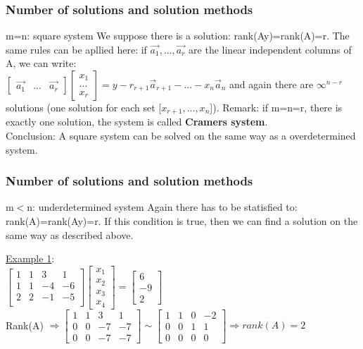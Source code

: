 \begin{frame}
	\frametitle{Number of solutions and solution methods}
	\begin{block}{m=n: square system}
		We suppose there is a solution: rank(Ay)=rank(A)=r. The same rules can be apllied here: if $\overrightarrow{a_1},...,\overrightarrow{a_r}$ are the linear independent columns of A, we can write:\\
		$\begin{bmatrix}
		\overrightarrow{a_1} & ... & \overrightarrow{a_r}
		\end{bmatrix} \begin{bmatrix}
		x_1\\...\\x_r
		\end{bmatrix}=y-r_{r+1}\overrightarrow{a}_{r+1}-...-x_n\overrightarrow{a}_n$ and again there are $\infty^{n-r}$ solutions (one solution for each set [$x_{r+1},...,x_{n}$]).\vspace{4mm}
		Remark: if m=n=r, there is exactly one solution, the system is called \textbf{Cramers system}.\\
		Conclusion: A square system can be solved on the same way as a overdetermined system. 
	\end{block}
\end{frame}

\begin{frame}
	\frametitle{Number of solutions and solution methods}
	\begin{block}{m$<$n: underdetermined system}
		Again there has to be statisfied to: rank(A)=rank(Ay)=r. If this condition is true, then we can find a solution on the same way as described above.\vspace{4mm} 
		
		\underline{Example 1}:\\
		$\begin{bmatrix}
		1 & 1 & 3 & 1\\
		1 & 1 & -4 & -6\\
		2 & 2 & -1 & -5\\
		\end{bmatrix}\begin{bmatrix}
		x_1\\x_2\\x_3\\x_4\end{bmatrix}=\begin{bmatrix}
		6\\-9\\2
		\end{bmatrix}$\\
		Rank(A) $\Rightarrow \begin{bmatrix}
		1 & 1 & 3 & 1\\
		0 & 0 & -7 & -7\\
		0 & 0 & -7 & -7
		\end{bmatrix} \sim \begin{bmatrix}
		1 & 1 & 0 & -2\\
		0 & 0 & 1 & 1\\
		0 & 0& 0& 0
		\end{bmatrix} \Rightarrow rank(A)=2$
	\end{block}
\end{frame}

